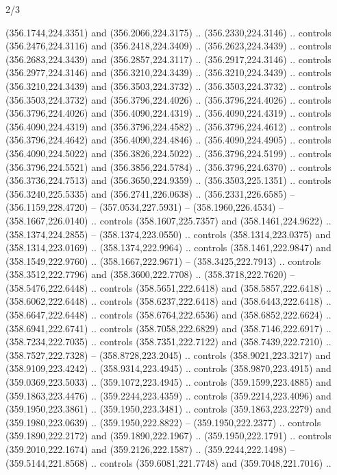 \begin{flagdescription}{2/3}
\begin{scope}[xshift=0.5\flaglength,yshift=0.5\flagwidth,scale=\flagwidth/495.65]
\begin{scope}[y=0.8pt, x=0.8pt, yscale=-1,shift={(-463.76,-309.78)}]
  (356.1744,224.3351) and (356.2066,224.3175) .. (356.2330,224.3146) .. controls
  (356.2476,224.3116) and (356.2418,224.3409) .. (356.2623,224.3439) .. controls
  (356.2683,224.3439) and (356.2857,224.3117) .. (356.2917,224.3146) .. controls
  (356.2977,224.3146) and (356.3210,224.3439) .. (356.3210,224.3439) .. controls
  (356.3210,224.3439) and (356.3503,224.3732) .. (356.3503,224.3732) .. controls
  (356.3503,224.3732) and (356.3796,224.4026) .. (356.3796,224.4026) .. controls
  (356.3796,224.4026) and (356.4090,224.4319) .. (356.4090,224.4319) .. controls
  (356.4090,224.4319) and (356.3796,224.4582) .. (356.3796,224.4612) .. controls
  (356.3796,224.4642) and (356.4090,224.4846) .. (356.4090,224.4905) .. controls
  (356.4090,224.5022) and (356.3826,224.5022) .. (356.3796,224.5199) .. controls
  (356.3796,224.5521) and (356.3856,224.5784) .. (356.3796,224.6370) .. controls
  (356.3736,224.7513) and (356.3650,224.9359) .. (356.3503,225.1351) .. controls
  (356.3240,225.5335) and (356.2741,226.0638) .. (356.2331,226.6585) --
  (356.1159,228.4720) -- (357.0534,227.5931) -- (358.1960,226.4534) --
  (358.1667,226.0140) .. controls (358.1607,225.7357) and (358.1461,224.9622) ..
  (358.1374,224.2855) -- (358.1374,223.0550) .. controls (358.1314,223.0375) and
  (358.1314,223.0169) .. (358.1374,222.9964) .. controls (358.1461,222.9847) and
  (358.1549,222.9760) .. (358.1667,222.9671) -- (358.3425,222.7913) .. controls
  (358.3512,222.7796) and (358.3600,222.7708) .. (358.3718,222.7620) --
  (358.5476,222.6448) .. controls (358.5651,222.6418) and (358.5857,222.6418) ..
  (358.6062,222.6448) .. controls (358.6237,222.6418) and (358.6443,222.6418) ..
  (358.6647,222.6448) .. controls (358.6764,222.6536) and (358.6852,222.6624) ..
  (358.6941,222.6741) .. controls (358.7058,222.6829) and (358.7146,222.6917) ..
  (358.7234,222.7035) .. controls (358.7351,222.7122) and (358.7439,222.7210) ..
  (358.7527,222.7328) -- (358.8728,223.2045) .. controls (358.9021,223.3217) and
  (358.9109,223.4242) .. (358.9314,223.4945) .. controls (358.9870,223.4915) and
  (359.0369,223.5033) .. (359.1072,223.4945) .. controls (359.1599,223.4885) and
  (359.1863,223.4476) .. (359.2244,223.4359) .. controls (359.2214,223.4096) and
  (359.1950,223.3861) .. (359.1950,223.3481) .. controls (359.1863,223.2279) and
  (359.1980,223.0639) .. (359.1950,222.8822) -- (359.1950,222.2377) .. controls
  (359.1890,222.2172) and (359.1890,222.1967) .. (359.1950,222.1791) .. controls
  (359.2010,222.1674) and (359.2126,222.1587) .. (359.2244,222.1498) --
  (359.5144,221.8568) .. controls (359.6081,221.7748) and (359.7048,221.7016) ..

\end{scope}
\end{scope}
\end{flagdescription}
